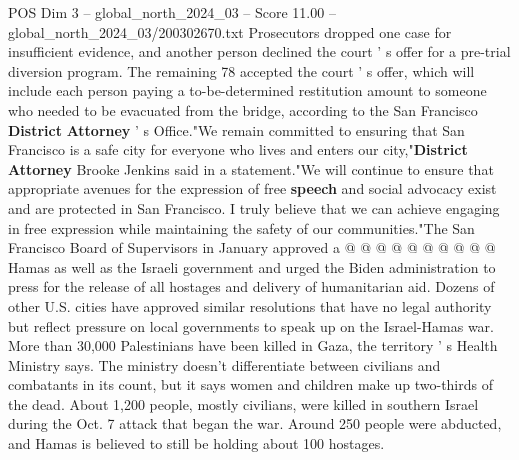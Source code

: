 \begin{textsample}{POS Dim 3 – global\_north\_2024\_03 – Score 11.00 – global\_north\_2024\_03/200302670.txt}
Prosecutors dropped one case for insufficient evidence, and another person declined the court ' s offer for a pre-trial diversion program.
The remaining 78 accepted the court ' s offer, which will include each person paying a to-be-determined restitution amount to someone who needed to be evacuated from the bridge, according to the San Francisco \textbf{District} \textbf{Attorney} ' s Office."We remain committed to ensuring that San Francisco is a safe city for everyone who lives and enters our city,"\textbf{District} \textbf{Attorney} Brooke Jenkins said in a statement."We will continue to ensure that appropriate avenues for the expression of free \textbf{speech} and social advocacy exist and are protected in San Francisco.
I truly believe that we can achieve engaging in free expression while maintaining the safety of our communities."The San Francisco Board of Supervisors in January approved a @ @ @ @ @ @ @ @ @ @ Hamas as well as the Israeli government and urged the Biden administration to press for the release of all hostages and delivery of humanitarian aid.
Dozens of other U.S. cities have approved similar resolutions that have no legal authority but reflect pressure on local governments to speak up on the Israel-Hamas war.
More than 30,000 Palestinians have been killed in Gaza, the territory ' s Health Ministry says.
The ministry doesn't differentiate between civilians and combatants in its count, but it says women and children make up two-thirds of the dead.
About 1,200 people, mostly civilians, were killed in southern Israel during the Oct. 7 attack that began the war.
Around 250 people were abducted, and Hamas is believed to still be holding about 100 hostages.

\end{textsample}
